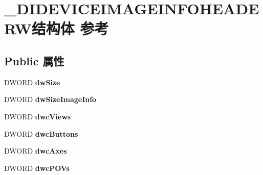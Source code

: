 \hypertarget{struct___d_i_d_e_v_i_c_e_i_m_a_g_e_i_n_f_o_h_e_a_d_e_r_w}{}\section{\+\_\+\+D\+I\+D\+E\+V\+I\+C\+E\+I\+M\+A\+G\+E\+I\+N\+F\+O\+H\+E\+A\+D\+E\+R\+W结构体 参考}
\label{struct___d_i_d_e_v_i_c_e_i_m_a_g_e_i_n_f_o_h_e_a_d_e_r_w}
\subsection*{Public 属性}
\begin{DoxyCompactItemize}
\item 
\mbox{\label{struct___d_i_d_e_v_i_c_e_i_m_a_g_e_i_n_f_o_h_e_a_d_e_r_w_a060b8c217c4e4559227f2a81c903325f}} 
D\+W\+O\+RD {\bfseries dw\+Size}
\item 
\mbox{\label{struct___d_i_d_e_v_i_c_e_i_m_a_g_e_i_n_f_o_h_e_a_d_e_r_w_ae960c133fc2b5522cc6f4b6f119f95aa}} 
D\+W\+O\+RD {\bfseries dw\+Size\+Image\+Info}
\item 
\mbox{\label{struct___d_i_d_e_v_i_c_e_i_m_a_g_e_i_n_f_o_h_e_a_d_e_r_w_a8309871e50e8995c22a7e52bebc0d7fc}} 
D\+W\+O\+RD {\bfseries dwc\+Views}
\item 
\mbox{\label{struct___d_i_d_e_v_i_c_e_i_m_a_g_e_i_n_f_o_h_e_a_d_e_r_w_a0ea2290c05af3d9dd476f22ecf6123d3}} 
D\+W\+O\+RD {\bfseries dwc\+Buttons}
\item 
\mbox{\label{struct___d_i_d_e_v_i_c_e_i_m_a_g_e_i_n_f_o_h_e_a_d_e_r_w_aa38a84dde6f2236555425e2ce37eae62}} 
D\+W\+O\+RD {\bfseries dwc\+Axes}
\item 
\mbox{\label{struct___d_i_d_e_v_i_c_e_i_m_a_g_e_i_n_f_o_h_e_a_d_e_r_w_a39f3d47f7d84fe382572be2498418623}} 
D\+W\+O\+RD {\bfseries dwc\+P\+O\+Vs}
\item 

\end{DoxyCompactItemize}
